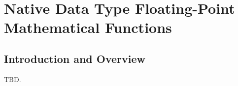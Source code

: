 \chapter{Native Data Type Floating-Point Mathematical Functions}
\label{cafn1}

\section{Introduction and Overview}
\label{cafn1:siov0}

TBD.

